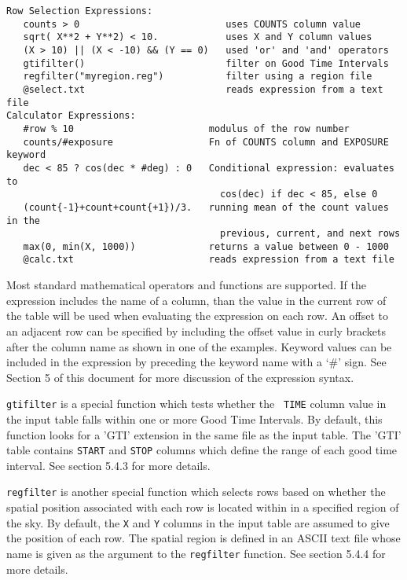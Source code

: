 \documentclass[11pt]{article}
\begin{document}
\begin{verbatim}
Row Selection Expressions:
   counts > 0                          uses COUNTS column value
   sqrt( X**2 + Y**2) < 10.            uses X and Y column values
   (X > 10) || (X < -10) && (Y == 0)   used 'or' and 'and' operators  
   gtifilter()                         filter on Good Time Intervals
   regfilter("myregion.reg")           filter using a region file
   @select.txt                         reads expression from a text file
Calculator Expressions:
   #row % 10                        modulus of the row number
   counts/#exposure                 Fn of COUNTS column and EXPOSURE keyword
   dec < 85 ? cos(dec * #deg) : 0   Conditional expression: evaluates to
                                      cos(dec) if dec < 85, else 0
   (count{-1}+count+count{+1})/3.   running mean of the count values in the
                                      previous, current, and next rows
   max(0, min(X, 1000))             returns a value between 0 - 1000
   @calc.txt                        reads expression from a text file
\end{verbatim}

Most standard mathematical operators and functions are supported.  If
the expression includes the name of a column, than the value in the
current row of the table will be used when evaluating the expression on
each row.   An offset to an adjacent row can be specified by including
the offset value in curly brackets after the column name as shown in
one of the examples.  Keyword values can be included in the expression
by preceding the keyword name with a `\#' sign.   See Section 5 of this
document for more discussion of the expression syntax.

{\tt gtifilter} is a special function which tests whether the {\tt
TIME} column value in the input table falls within one or more Good
Time Intervals.  By default, this function looks for a 'GTI' extension
in the same file as the input table.  The 'GTI' table contains {\tt START} 
and {\tt STOP} columns which define the range of
each good time interval. See section 5.4.3 for more details.

{\tt regfilter} is another special function which selects rows based on
whether the spatial position associated with each row is located within
in a specified region of the sky.  By default, the {\tt X} and {\tt Y}
columns in the input table are assumed to give the position of each row.
The spatial region is defined in an ASCII text file whose name is given
as the argument to the {\tt regfilter} function. See section 5.4.4 for
more details.
\end{document}
